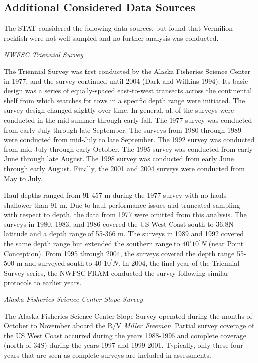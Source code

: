 \documentclass[
  english,
  a4paper,
]{article}
\begin{document}
\hypertarget{additional-considered-data-sources}{%
\subsection{Additional Considered Data Sources}\label{additional-considered-data-sources}}

The STAT considered the following data sources, but found that Vermilion rockfish were not well sampled and no further analysis was conducted.

\emph{NWFSC Triennial Survey}

The Triennial Survey was first conducted by the Alaska Fisheries Science Center in 1977, and the survey
continued until 2004 (Dark and Wilkins 1994).
Its basic design was a series of equally-spaced east-to-west transects across
the continental shelf from which searches for tows in a specific depth range were initiated.
The survey design changed slightly over time.
In general, all of the surveys were conducted in the mid summer through early fall.
The 1977 survey was conducted from early July through late September.
The surveys from 1980 through 1989 were conducted from mid-July to late September.
The 1992 survey was conducted from mid July through early October.
The 1995 survey was conducted from early June through late August.
The 1998 survey was conducted from early June through early August.
Finally, the 2001 and 2004 surveys were conducted from May to July.

Haul depths ranged from 91-457 m during the 1977 survey with no hauls shallower
than 91 m.
Due to haul performance issues and truncated sampling with respect to depth, the
data from 1977 were omitted from this analysis.
The surveys in 1980, 1983, and 1986 covered the US West Coast south to
36.8\textdegree N latitude and a depth range of 55-366 m.
The surveys in 1989 and 1992 covered the same depth range but extended the
southern range to $40^\circ 10^\prime N$ (near Point Conception).
From 1995 through 2004, the surveys covered the depth range 55-500 m and
surveyed south to $40^\circ 10^\prime N$.
In 2004, the final year of the Triennial Survey series, the NWFSC FRAM
conducted the survey following similar protocols to earlier years.

\emph{Alaska Fisheries Science Center Slope Survey}

The Alaska Fisheries Science Center Slope Survey operated during the months of October to November aboard the
R/V \emph{Miller Freeman}.
Partial survey coverage of the US West Coast occurred during the years 1988-1996
and complete coverage (north of 34\textquotesingle S) during the
years 1997 and 1999-2001.
Typically, only these four years that are seen as complete surveys are included
in assessments.
\end{document}
